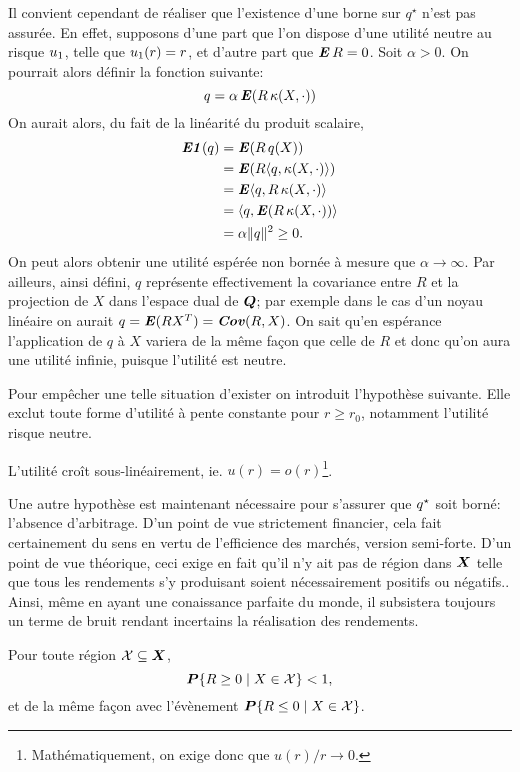 Il convient cependant de réaliser que l'existence d'une borne sur $q^\star$ n'est pas
assurée. En effet, supposons d'une part que l'on dispose d'une utilité neutre au risque
$u_1$, telle que $u_1(r) = r$, et d'autre part que $\operatorname{\mbox{\textbf{\textit{E}}}} R=0$. Soit $\alpha>0$. On pourrait alors
définir la fonction suivante:
\begin{equation}
  q = \alpha\operatorname{\mbox{\textbf{\textit{E}}}}(R\,\kappa(X,\cdot))
\end{equation}
On aurait alors, du fait de la linéarité du produit scalaire,
\begin{align}
  \operatorname{\mbox{\textbf{\textit{E1}}}}(q) &= \operatorname{\mbox{\textbf{\textit{E}}}}(R\,q(X))\\
         & =\operatorname{\mbox{\textbf{\textit{E}}}}(R\langle q,\kappa(X,\cdot)\rangle)\\
         & =\operatorname{\mbox{\textbf{\textit{E}}}}\langle q,R\,\kappa(X,\cdot)\rangle\\
         & =\langle q,\operatorname{\mbox{\textbf{\textit{E}}}}(R\,\kappa(X,\cdot))\rangle\\
         &= \alpha\|q\|^2 \geq 0.
\end{align}
On peut alors obtenir une utilité espérée non bornée à mesure que $\alpha\to\infty$. Par ailleurs,
ainsi défini, $q$ représente effectivement la covariance entre $R$ et la projection de $X$
dans l'espace dual de $\bm Q$; par exemple dans le cas d'un noyau linéaire on aurait
$q = \operatorname{\mbox{\textbf{\textit{E}}}}(RX^T) = \operatorname{\mbox{\textbf{\textit{Cov}}}}(R,X)$. On sait qu'en espérance l'application de $q$ à $X$ variera de
la même façon que celle de $R$ et donc qu'on aura une utilité infinie, puisque l'utilité
est neutre.

Pour empêcher une telle situation d'exister on introduit l'hypothèse suivante. Elle exclut
toute forme d'utilité à pente constante pour $r \geq r_0$, notamment l'utilité risque neutre.
\begin{assumption}
  L'utilité croît sous-linéairement, ie. $u(r) = o(r)$\footnote{Mathématiquement, on exige
    donc que $u(r)/r \to 0$.}. 
\end{assumption}

Une autre hypothèse est maintenant nécessaire pour s'assurer que $q^\star$ soit borné:
l'absence d'arbitrage. D'un point de vue strictement financier, cela fait certainement du
sens en vertu de l'efficience des marchés, version semi-forte\cit. D'un point de vue
théorique, ceci exige en fait qu'il n'y ait pas de région dans $\bm{X}$ telle que tous les
rendements s'y produisant soient nécessairement positifs ou négatifs.. Ainsi, même en ayant une conaissance parfaite du monde, il subsistera toujours
un terme de bruit rendant incertains la réalisation des rendements.

\begin{assumption}
  \label{hyp:arb}
  Pour toute région $\mathcal{X}\subseteq\bm{X}$,
  \begin{equation}
    \bm P\{R \geq 0 \mid X \in \mathcal{X}\} < 1,
  \end{equation}
  et de la même façon avec l'évènement $\bm P\{R \leq 0 \mid X \in \mathcal{X}\}$. 
\end{assumption}


